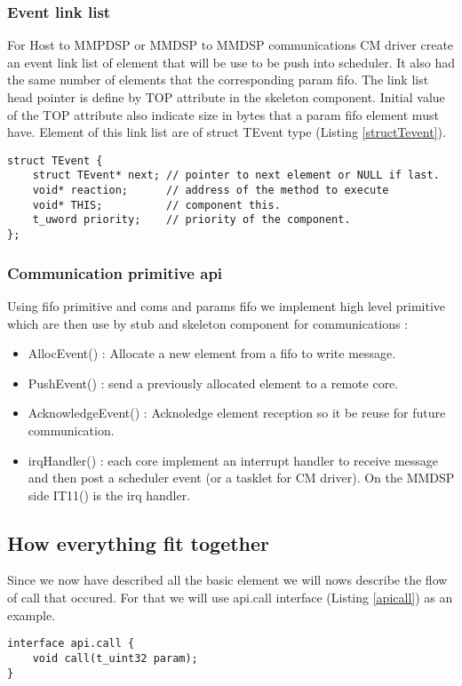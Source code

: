 \subsubsection{Event link list}
For Host to MMPDSP or MMDSP to MMDSP communications CM driver create an event
link list of element that will be use to be push into scheduler. It also had the
same number of elements that the corresponding param fifo. The link list head
pointer is define by TOP attribute in the skeleton component. Initial value of
the TOP attribute also indicate size in bytes that a param fifo element must
have. Element of this link list are of struct TEvent type (Listing
\ref{structTevent}).

\begin{lstlisting}[caption=struct TEvent description, label=structTevent]
struct TEvent {
    struct TEvent* next; // pointer to next element or NULL if last.
    void* reaction;      // address of the method to execute
    void* THIS;          // component this.
    t_uword priority;    // priority of the component.
};
\end{lstlisting}

\subsubsection{Communication primitive api}
Using fifo primitive and coms and params fifo we implement high level primitive
which are then use by stub and skeleton component for communications :
\begin{itemize}
  \item AllocEvent() : Allocate a new element from a fifo to write message.
  \item PushEvent() : send a previously allocated element to a remote core.
  \item AcknowledgeEvent() : Acknoledge element reception so it be reuse for
  future communication.
  \item irqHandler() : each core implement an interrupt handler to receive
  message and then post a scheduler event (or a tasklet for CM driver). On the
  MMDSP side IT11() is the irq handler.
\end{itemize}

\subsection{How everything fit together}
Since we now have described all the basic element we will nows describe the flow
of call that occured. For that we will use api.call interface (Listing
\ref{apicall}) as an example.
\begin{lstlisting}[caption=api.call interface declaration, label=apicall]
interface api.call {
    void call(t_uint32 param);
}
\end{lstlisting}

